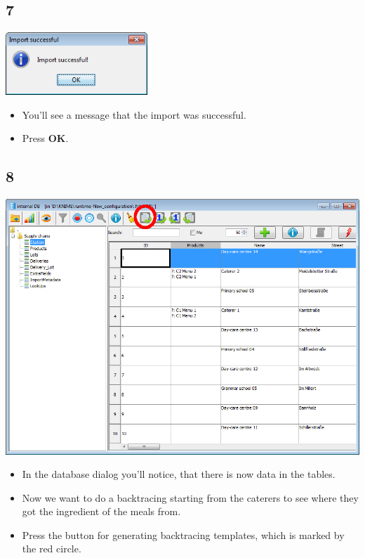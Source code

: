 \documentclass{beamer}
\begin{document}
\subsection{7}
\begin{frame}
	\begin{center}
  		\includegraphics[width=0.4\textwidth]{7.png}
	\end{center}
	\begin{itemize}
		\item You'll see a message that the import was successful.
		\item Press \textbf{OK}.
	\end{itemize}
\end{frame}

\subsection{8}
\begin{frame}
	\begin{center}
  		\includegraphics[height=0.5\textheight]{8.png}
	\end{center}
	\begin{itemize}
		\item In the database dialog you'll notice, that there is now data in the tables.
		\item Now we want to do a backtracing starting from the caterers to see where they got the ingredient of the meals from.
		\item Press the button for generating backtracing templates, which is marked by the red circle.
	\end{itemize}
\end{frame}
\end{document}
